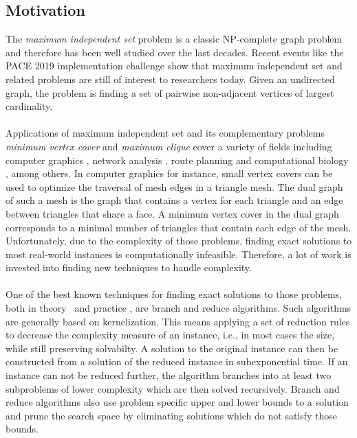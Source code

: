 \documentclass[12pt,a4paper,twoside]{scrartcl}
\numberwithin{equation}{section}
\begin{document}
\subsection{Motivation}
The \emph{maximum independent set} problem is a classic NP-complete graph problem \cite{GareyJohnson} and therefore has been well studied over the last decades. Recent events like the PACE 2019 implementation challenge \cite{pace} show that maximum independent set and related problems are still of interest to researchers today. Given an undirected graph, the problem is finding a set of pairwise non-adjacent vertices of largest cardinality.\paragraph{}
Applications of maximum independent set and its complementary problems \emph{minimum vertex cover} and \emph{maximum clique} cover a variety of fields including computer graphics \cite{CG}, network analysis \cite{NW}, route planning \cite{RP} and computational biology \cite{BIO1, BIO2}, among others. In computer graphics for instance, small vertex covers can be used to optimize the traversal of mesh edges in a triangle mesh. The dual graph of such a mesh is the graph that contains a vertex for each triangle and an edge between triangles that share a face. A minimum vertex cover in the dual graph corresponds to a minimal number of triangles that contain each edge of the mesh. Unfortunately, due to the complexity of those problems, finding exact solutions to most real-world instances is computationally infeasible. Therefore, a lot of work is invested into finding new techniques to handle complexity. \paragraph{}
One of the best known techniques for finding exact solutions to those problems, both in theory~\cite{XiaoNagamochi, ChenXiaKanj} and practice \cite{AkibaIwata}, are branch and reduce algorithms. Such algorithms are generally based on kernelization. This means applying a set of reduction rules to decrease the complexity measure of an instance, i.e., in most cases the size, while still preserving solvabilty. A solution to the original instance can then be constructed from a solution of the reduced instance in subexponential time. If an instance can not be reduced further, the algorithm branches into at least two subproblems of lower complexity which are then solved recursively. Branch and reduce algorithms also use problem specific upper and lower bounds to a solution and prune the search space by eliminating solutions which do not satisfy those bounds. \paragraph{}
\end{document}
